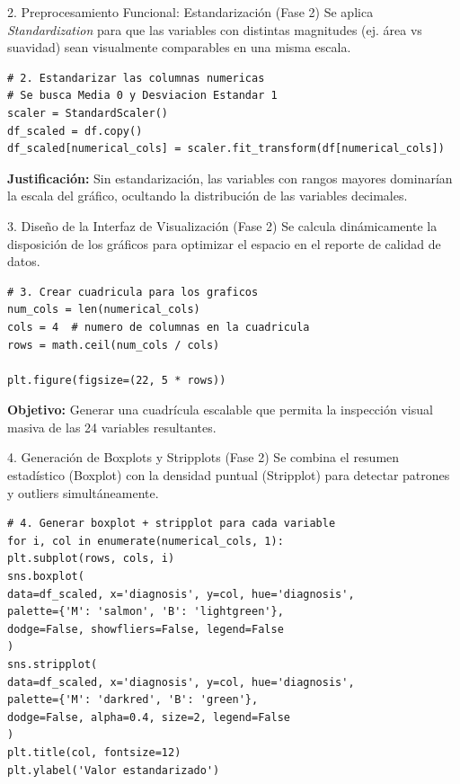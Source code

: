 \documentclass{beamer}
\begin{document}
	\begin{frame}[fragile]{2. Preprocesamiento Funcional: Estandarización (Fase 2)}
		Se aplica \textit{Standardization} para que las variables con distintas magnitudes (ej. área vs suavidad) sean visualmente comparables en una misma escala.
		\onslide<2->\begin{lstlisting}[style=colab]
# 2. Estandarizar las columnas numericas
# Se busca Media 0 y Desviacion Estandar 1
scaler = StandardScaler()
df_scaled = df.copy()
df_scaled[numerical_cols] = scaler.fit_transform(df[numerical_cols])
		\end{lstlisting}
		\textbf{Justificación:} Sin estandarización, las variables con rangos mayores dominarían la escala del gráfico, ocultando la distribución de las variables decimales.
	\end{frame}
	
	\begin{frame}[fragile]{3. Diseño de la Interfaz de Visualización (Fase 2)}
		Se calcula dinámicamente la disposición de los gráficos para optimizar el espacio en el reporte de calidad de datos.
		\onslide<2->\begin{lstlisting}[style=colab]
# 3. Crear cuadricula para los graficos
num_cols = len(numerical_cols)
cols = 4  # numero de columnas en la cuadricula
rows = math.ceil(num_cols / cols)

plt.figure(figsize=(22, 5 * rows))
		\end{lstlisting}
		\textbf{Objetivo:} Generar una cuadrícula escalable que permita la inspección visual masiva de las 24 variables resultantes.
	\end{frame}
	
	\begin{frame}[fragile]{4. Generación de Boxplots y Stripplots (Fase 2)}
		Se combina el resumen estadístico (Boxplot) con la densidad puntual (Stripplot) para detectar patrones y outliers simultáneamente.
		\onslide<2->\begin{lstlisting}[style=colab]
# 4. Generar boxplot + stripplot para cada variable
for i, col in enumerate(numerical_cols, 1):
plt.subplot(rows, cols, i)
sns.boxplot(
data=df_scaled, x='diagnosis', y=col, hue='diagnosis',
palette={'M': 'salmon', 'B': 'lightgreen'},
dodge=False, showfliers=False, legend=False
)
sns.stripplot(
data=df_scaled, x='diagnosis', y=col, hue='diagnosis',
palette={'M': 'darkred', 'B': 'green'},
dodge=False, alpha=0.4, size=2, legend=False
)
plt.title(col, fontsize=12)
plt.ylabel('Valor estandarizado')
		\end{lstlisting}
	\end{frame}
	
\end{document}

